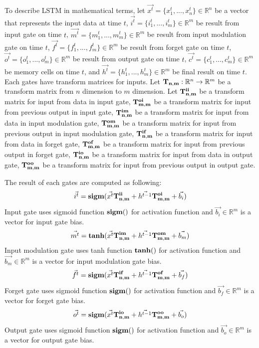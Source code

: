 \documentclass[draft,dvipsnames]{drexel-thesis}
\begin{document}
\begin{thesis}
\begin{enumerate}
\begin{enumerate}
		To describe LSTM in mathematical terms, let $\vec{x^t} = \{ x_1^t, ..., x_n^t\} \in \mathbb{R}^n$ be a vector that represents the input data at time $t$, $\vec{i^t} = \{i_1^t, ..., i_m^t\} \in \mathbb{R}^m$ be result from input gate on time $t$, $\vec{m^t} = \{m_1^t, ..., m_m^t\} \in \mathbb{R}^m$ be result from input modulation gate on time $t$, $\vec{f^t} = \{f_1^t, ..., f_m^t\} \in \mathbb{R}^m$ be result from forget gate on time $t$, $\vec{o^t} = \{o_1^t, ..., o_m^t\} \in \mathbb{R}^m$ be result from output gate on time $t$, $\vec{c^t} = \{c_1^t, ..., c_m^t\} \in \mathbb{R}^m$ be memory cells on time $t$, and $\vec{h^t} = \{h_1^t, ..., h_m^t\} \in \mathbb{R}^m$ be final result on time $t$.
Each gates have transform matrices for inputs. Let $\bold{T_{n,m}}: \mathbb{R}^n \rightarrow \mathbb{R}^m$ be a transform matrix from $n$ dimension to $m$ dimension. Let $\bold{T_{n,m}^{ii}}$ be a transform matrix for input from data in input gate, $\bold{T_{m,m}^{oi}}$ be a transform matrix for input from previous output in input gate, $\bold{T_{n,m}^{im}}$ be a transform matrix for input from data in input modulation gate, $\bold{T_{m,m}^{om}}$ be a transform matrix for input from previous output in input modulation gate, $\bold{T_{n,m}^{if}}$ be a transform matrix for input from data in forget gate, $\bold{T_{m,m}^{of}}$ be a transform matrix for input from previous output in forget gate, $\bold{T_{n,m}^{io}}$ be a transform matrix for input from data in output gate, $\bold{T_{m,m}^{oo}}$ be a transform matrix for input from previous output in output gate.

		The result of each gates are computed as following:
		$$\vec{i^t} = \bold{sigm}(\vec{x^t}\bold{T_{n,m}^{ii}} + \vec{h^{t-1}}\bold{T_{m,m}^{oi}} + \vec{b_i})$$
		Input gate uses sigmoid function $\bold{sigm()}$ for activation function and $\vec{b_i} \in \mathbb{R}^m$ is a vector for input gate bias.
		$$\vec{m^t} = \bold{tanh}(\vec{x^t}\bold{T_{n,m}^{im}} + \vec{h^{t-1}}\bold{T_{m,m}^{om}} + \vec{b_m})$$
		Input modulation gate uses tanh function $\bold{tanh()}$ for activation function and $\vec{b_m} \in \mathbb{R}^m$ is a vector for input modulation gate bias.
		$$\vec{f^t} = \bold{sigm}(\vec{x^t}\bold{T_{n,m}^{if}} + \vec{h^{t-1}}\bold{T_{m,m}^{of}} + \vec{b_f})$$
		Forget gate uses sigmoid function $\bold{sigm()}$ for activation function and $\vec{b_f} \in \mathbb{R}^m$ is a vector for forget gate bias.
		$$\vec{o^t} = \bold{sigm}(\vec{x^t}\bold{T_{n,m}^{io}} + \vec{h^{t-1}}\bold{T_{m,m}^{oo}} + \vec{b_o})$$
		Output gate uses sigmoid function $\bold{sigm()}$ for activation function and $\vec{b_o} \in \mathbb{R}^m$ is a vector for output gate bias.
		

\end{enumerate}
\end{enumerate}
\end{thesis}
\end{document}
